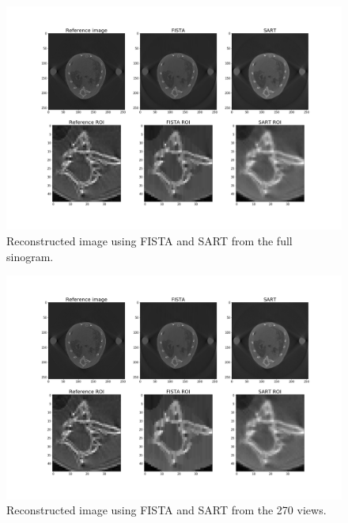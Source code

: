 \documentclass[11pt]{article}
\begin{document}
\begin{figure}[H]
	\centering
	\includegraphics[height=0.35\paperheight]{results/comparisonFull.png}
	\caption{Reconstructed image using FISTA and SART from the full sinogram.}
	\label{fig:comparisonfull}
\end{figure}

\begin{figure}[H]
	\centering
	\includegraphics[height=0.35\paperheight]{results/comparison270.png}
	\caption{Reconstructed image using FISTA and SART from the 270 views.}
	\label{fig:comparison270}
\end{figure}
\end{document}
